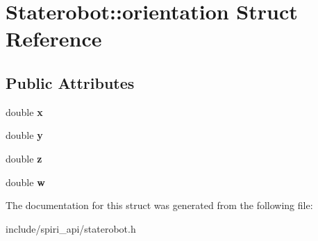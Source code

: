 \hypertarget{struct_staterobot_1_1orientation}{\section{\-Staterobot\-:\-:orientation \-Struct \-Reference}
\label{struct_staterobot_1_1orientation}
}
\subsection*{\-Public \-Attributes}
\begin{DoxyCompactItemize}
\item 
\hypertarget{struct_staterobot_1_1orientation_a80c9435261eb26f4dc9e8ee1b48e6c09}{double {\bfseries x}}\label{struct_staterobot_1_1orientation_a80c9435261eb26f4dc9e8ee1b48e6c09}

\item 
\hypertarget{struct_staterobot_1_1orientation_aaf185b66698290dcebcbbafb31882730}{double {\bfseries y}}\label{struct_staterobot_1_1orientation_aaf185b66698290dcebcbbafb31882730}

\item 
\hypertarget{struct_staterobot_1_1orientation_a2b37f5a27eea1871478b337c0a4e3e92}{double {\bfseries z}}\label{struct_staterobot_1_1orientation_a2b37f5a27eea1871478b337c0a4e3e92}

\item 
\hypertarget{struct_staterobot_1_1orientation_a48f7d566014e6099c3c0af42e7ed3006}{double {\bfseries w}}\label{struct_staterobot_1_1orientation_a48f7d566014e6099c3c0af42e7ed3006}

\end{DoxyCompactItemize}


\-The documentation for this struct was generated from the following file\-:\begin{DoxyCompactItemize}
\item 
include/spiri\-\_\-api/staterobot.\-h\end{DoxyCompactItemize}
